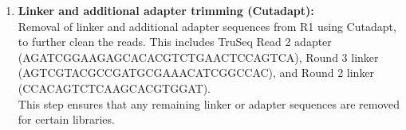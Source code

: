 \documentclass[
  11pt,
  a4paper,
]{report}
\newenvironment{Shaded}{\begin{snugshade}}{\end{snugshade}}
\newcommand{\AttributeTok}[1]{\textcolor[rgb]{0.40,0.45,0.13}{#1}}
\newcommand{\DataTypeTok}[1]{\textcolor[rgb]{0.68,0.00,0.00}{#1}}
\newcommand{\ExtensionTok}[1]{\textcolor[rgb]{0.00,0.23,0.31}{#1}}
\newcommand{\NormalTok}[1]{\textcolor[rgb]{0.00,0.23,0.31}{#1}}
\newcommand{\OperatorTok}[1]{\textcolor[rgb]{0.37,0.37,0.37}{#1}}
\newcommand{\StringTok}[1]{\textcolor[rgb]{0.13,0.47,0.30}{#1}}
\newcommand{\VariableTok}[1]{\textcolor[rgb]{0.07,0.07,0.07}{#1}}
\begin{document}
\begin{enumerate}
\begin{Shaded}
\end{Shaded}
\item
  \textbf{Linker and additional adapter trimming (Cutadapt):}\\
  Removal of linker and additional adapter sequences from R1 using
  Cutadapt, to further clean the reads. This includes TruSeq Read 2
  adapter (AGATCGGAAGAGCACACGTCTGAACTCCAGTCA), Round 3 linker
  (AGTCGTACGCCGATGCGAAACATCGGCCAC), and Round 2 linker
  (CCACAGTCTCAAGCACGTGGAT).\\
  This step ensures that any remaining linker or adapter sequences are
  removed for certain libraries.


\end{enumerate}
\end{document}
